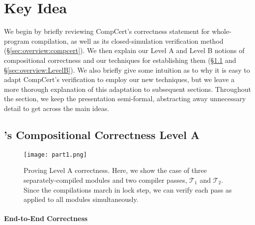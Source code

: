 \section{Key Idea}
\label{sec:sepcomp:keyidea}

We begin by briefly reviewing CompCert's correctness statement for
whole-program compilation, as well as its closed-simulation verification
method (\S\ref{sec:overview:compcert}).  We then explain our Level A
and Level B notions of compositional correctness and our techniques
for establishing them (\S\ref{sec:overview:LevelA} and
\S\ref{sec:overview:LevelB}).  We also briefly give some intuition as
to why it is easy to adapt CompCert's verification to employ our new
techniques, but we leave a more thorough explanation of this
adaptation to subsequent sections.  Throughout the section, we keep
the presentation semi-formal, abstracting away unnecessary detail to
get across the main ideas.

\subsection{\sepcomp{}'s Compositional Correctness Level A}
\label{sec:overview:LevelA}

\begin{figure}[!t]
\begin{center}
\texttt{[image: part1.png]}
\end{center}
\caption{Proving Level A correctness.  Here, we show the case
  of three separately-compiled modules and two compiler passes,
  $\mathcal{T}_1$ and $\mathcal{T}_2$.  Since the compilations march
  in lock step, we can verify each pass as applied to all modules
  simultaneously.}
\label{fig:LevelA}
\end{figure}


\paragraph{End-to-End Correctness}

